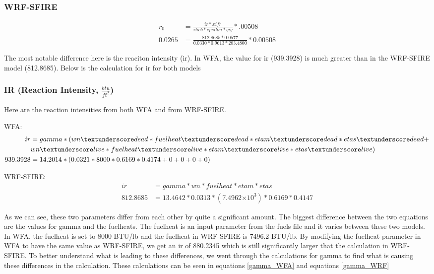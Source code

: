 \documentclass{article}
\newcommand\tenpow[1]{\ensuremath{{\times}10^{#1}}}
\newcommand\und{\textunderscore}
\begin{document}
\subsubsection*{WRF-SFIRE}
\begin{equation}
	\label{WRF-ROS}
	\begin{split}
		r_0 &= \frac{ir*xifr}{rhob * epsilon *qig} * .00508 \\
		0.0265 &= \frac{812.8685 * 0.0577}{0.0330 * 0.9613 * 283.4800} * 0.00508
	\end{split}
\end{equation}


The most notable difference here is the reaciton intensity (ir). In WFA, the value for ir (939.3928) is much greater than in the WRF-SFIRE model (812.8685). Below is the calculation for ir for both models 


\subsubsection{IR (Reaction Intensity, $\frac{btu}{ft^2}$)}
Here are the reaction intensities from both WFA and from WRF-SFIRE. 

WFA: 
\begin{equation}
\label{WFA_IR_2}
\begin{split}
		ir &= gamma * (wn\und dead * fuelheat\und dead * etam\und dead * etas\und dead + \\
		& wn\und live * fuelheat\und live * etam\und live * etas\und live) \\
        939.3928 &= 14.2014 * (0.0321 * 8000 * 0.6169 * 0.4174 + 0 + 0 + 0 + 0)
\end{split}
\end{equation}
	
WRF-SFIRE:
\begin{equation}
\label{IR_WRF_2}
	\begin{split}
		ir       &= gamma * wn * fuelheat * etam * etas \\
		812.8685 &= 13.4642 * 0.0313 * (7.4962 \tenpow{3}) * 0.6169 * 0.4147
	\end{split}
\end{equation}


As we can see, these two parameters differ from each other by quite a significant amount. The biggest difference between the two equations are the values for gamma and the fuelheats. The fuelheat is an input parameter from the fuels file and it varies between these two models. In WFA, the fuelheat is set to 8000 BTU/lb and the fuelheat in WRF-SFIRE is 7496.2 BTU/lb. By modifying the fuelheat parameter in WFA to have the same value as WRF-SFIRE, we get an ir of 880.2345 which is still significantly larger that the calculation in WRF-SFIRE. To better understand what is leading to these differences, we went through the calculations for gamma to find what is causing these differences in the calculation. These calculations can be seen in equations \ref{gamma_WFA} and equations \ref{gamma_WRF}
\end{document}
